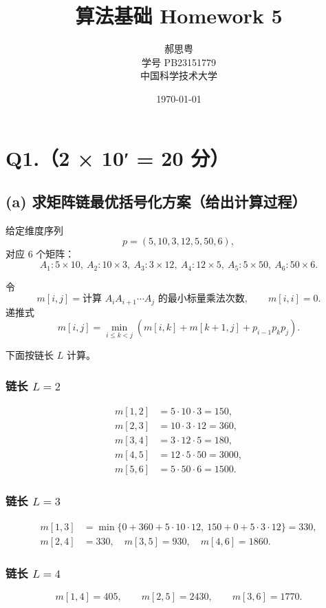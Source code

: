 \documentclass[12pt,a4paper,oneside]{ctexart}
\title{\textbf{算法基础 Homework 5}}
\author{郝思粤 \\ 学号 PB23151779 \\ 中国科学技术大学}
\date{\today}
\begin{document}
\maketitle
\newpage

\maketitle

\section*{Q1.（2 × 10′ = 20 分）}

\subsection*{(a) 求矩阵链最优括号化方案（给出计算过程）}

给定维度序列
\[
p=(5,10,3,12,5,50,6),
\]
对应 6 个矩阵：
\[
A_1:5\times 10,\
A_2:10\times 3,\
A_3:3\times 12,\
A_4:12\times 5,\
A_5:5\times 50,\
A_6:50\times 6.
\]

令
\[
m[i,j]=\text{计算 }A_i A_{i+1}\cdots A_j\text{ 的最小标量乘法次数},\qquad m[i,i]=0.
\]
递推式
\[
m[i,j]=\min_{i\le k<j}\left(m[i,k]+m[k+1,j]+p_{i-1}p_kp_j\right).
\]

下面按链长 $L$ 计算。

\subsubsection*{链长 $L=2$}
\[
\begin{aligned}
m[1,2]&=5\cdot 10\cdot 3=150,\\
m[2,3]&=10\cdot 3\cdot 12=360,\\
m[3,4]&=3\cdot 12\cdot 5=180,\\
m[4,5]&=12\cdot 5\cdot 50=3000,\\
m[5,6]&=5\cdot 50\cdot 6=1500.
\end{aligned}
\]

\subsubsection*{链长 $L=3$}
\[
\begin{aligned}
m[1,3]&=\min\{0+360+5\cdot10\cdot12,\ 150+0+5\cdot3\cdot12\}=330,\\
m[2,4]&=330,\quad
m[3,5]=930,\quad
m[4,6]=1860.
\end{aligned}
\]

\subsubsection*{链长 $L=4$}
\[
m[1,4]=405,\qquad
m[2,5]=2430,\qquad
m[3,6]=1770.
\]
\end{document}
